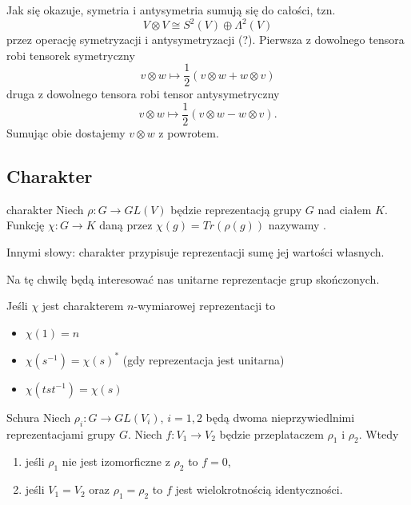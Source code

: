 Jak się okazuje, symetria i antysymetria sumują się do całości, tzn.
$$V\otimes V\cong S^2(V)\oplus \Lambda^2(V)$$
przez operację symetryzacji i antysymetryzacji (?). Pierwsza z dowolnego tensora robi tensorek symetryczny
$$v\otimes w\mapsto\frac{1}{2}(v\otimes w+w\otimes v)$$
druga z dowolnego tensora robi tensor antysymetryczny
$$v\otimes w\mapsto\frac{1}{2}(v\otimes w-w\otimes v).$$
Sumując obie dostajemy $v\otimes w$ z powrotem.

\subsection{Charakter}

\begin{definition}{charakter}{}
  Niech $\rho:G\to GL(V)$ będzie reprezentacją grupy $G$ nad ciałem $K$. Funkcję $\chi:G\to K$ daną przez $\chi(g)=Tr(\rho(g))$ nazywamy .
\end{definition}

Innymi słowy: charakter przypisuje reprezentacji sumę jej wartości własnych.

Na tę chwilę będą interesować nas unitarne reprezentacje grup skończonych.

\begin{fact}{}{}
  Jeśli $\chi$ jest charakterem $n$-wymiarowej reprezentacji to
  \begin{itemize}
    \item $\chi(1)=n$
    \item $\chi(s^{-1})=\chi(s)^*$ (gdy reprezentacja jest unitarna)
    \item $\chi(tst^{-1})=\chi(s)$
  \end{itemize}
\end{fact}

\begin{lemma}{Schura}{}
  Niech $\rho_i:G\to GL(V_i)$, $i=1,2$ będą dwoma nieprzywiedlnimi reprezentacjami grupy $G$. Niech $f:V_1\to V_2$ będzie przeplataczem $\rho_1$ i $\rho_2$. Wtedy
  \begin{enumerate}
    \item jeśli $\rho_1$ nie jest izomorficzne z $\rho_2$ to $f=0$,
    \item jeśli $V_1=V_2$ oraz $\rho_1=\rho_2$ to $f$ jest wielokrotnością identyczności.
  \end{enumerate}
\end{lemma}

